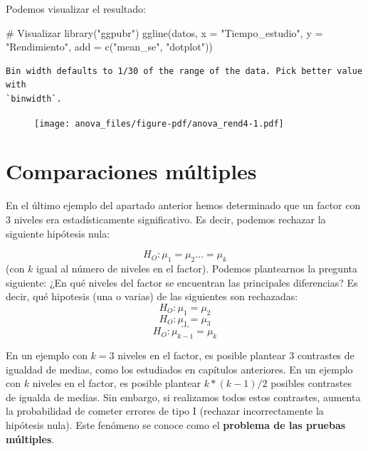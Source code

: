 \documentclass[
  letterpaper,
  DIV=11,
  numbers=noendperiod]{scrreprt}
\newenvironment{Shaded}{\begin{snugshade}}{\end{snugshade}}
\newcommand{\AttributeTok}[1]{\textcolor[rgb]{0.40,0.45,0.13}{#1}}
\newcommand{\CommentTok}[1]{\textcolor[rgb]{0.37,0.37,0.37}{#1}}
\newcommand{\FunctionTok}[1]{\textcolor[rgb]{0.28,0.35,0.67}{#1}}
\newcommand{\NormalTok}[1]{\textcolor[rgb]{0.00,0.23,0.31}{#1}}
\newcommand{\StringTok}[1]{\textcolor[rgb]{0.13,0.47,0.30}{#1}}
\begin{document}
\begin{tcolorbox}
Podemos visualizar el resultado:

\begin{Shaded}
\begin{Highlighting}[]
\CommentTok{\# Visualizar}
\FunctionTok{library}\NormalTok{(}\StringTok{"ggpubr"}\NormalTok{)}
\FunctionTok{ggline}\NormalTok{(datos, }\AttributeTok{x =} \StringTok{"Tiempo\_estudio"}\NormalTok{, }\AttributeTok{y =} \StringTok{"Rendimiento"}\NormalTok{,}
       \AttributeTok{add =} \FunctionTok{c}\NormalTok{(}\StringTok{"mean\_se"}\NormalTok{, }\StringTok{"dotplot"}\NormalTok{))}
\end{Highlighting}
\end{Shaded}

\begin{verbatim}
Bin width defaults to 1/30 of the range of the data. Pick better value with
`binwidth`.
\end{verbatim}

\begin{figure}[H]

{\centering \texttt{[image: anova\_files/figure-pdf/anova\_rend4-1.pdf]}

}

\end{figure}

\end{tcolorbox}

\hypertarget{comparaciones-muxfaltiples}{%
\section{Comparaciones múltiples}\label{comparaciones-muxfaltiples}}

En el último ejemplo del apartado anterior hemos determinado que un
factor con \(3\) niveles era estadísticamente significativo. Es decir,
podemos rechazar la siguiente hipótesis nula:

\[H_O: \mu_1=\mu_2\ldots = \mu_k\] (con \(k\) igual al número de niveles
en el factor). Podemos plantearnos la pregunta siguiente: ¿En qué
niveles del factor se encuentran las principales diferencias? Es decir,
qué hipotesis (una o varias) de las siguientes son rechazadas:
\[H_O: \mu_1=\mu_2\] \[H_O: \mu_1=\mu_3\] \[\ldots\]
\[H_O: \mu_{k-1} = \mu_k\]

En un ejemplo con \(k=3\) niveles en el factor, es posible plantear
\(3\) contrastes de igualdad de medias, como los estudiados en capítulos
anteriores. En un ejemplo con \(k\) niveles en el factor, es posible
plantear \(k*(k-1)/2\) posibles contrastes de igualda de medias. Sin
embargo, si realizamos todos estos contrastes, aumenta la probabilidad
de cometer errores de tipo I (rechazar incorrectamente la hipótesis
nula). Este fenómeno se conoce como el \textbf{problema de las pruebas
múltiples}.
\end{document}
